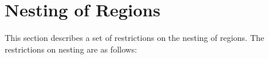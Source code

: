 %
%
%
%
%
%
%
%
%
%
%
%
%


\section{Nesting of Regions}
\label{sec:Nesting of Regions}
This section describes a set of restrictions on the nesting of regions. The 
restrictions on nesting are as follows:

